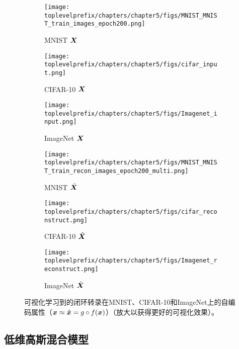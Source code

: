 \documentclass[../../book-main_zh.tex]{subfiles}
\begin{document}
\begin{figure}[t]
    \begin{subfigure}[t]{0.3\textwidth}
        \centering
        \texttt{[image: \\toplevelprefix/chapters/chapter5/figs/MNIST\_MNIST\_train\_images\_epoch200.png]}
        \caption{{\small MNIST $\bm{X}$}}
    \end{subfigure}
    \hfill
    \begin{subfigure}[t]{0.3\textwidth}
        \centering
        \texttt{[image: \\toplevelprefix/chapters/chapter5/figs/cifar\_input.png]}
        \caption{{\small CIFAR-10 $\bm{X}$}}
    \end{subfigure}
    \hfill
    \begin{subfigure}[t]{0.3\textwidth}
        \centering
        \texttt{[image: \\toplevelprefix/chapters/chapter5/figs/Imagenet\_input.png]}
        \caption{{\small ImageNet $\bm{X}$}}
    \end{subfigure}

    \begin{subfigure}[t]{0.3\textwidth}
        \centering
        \texttt{[image: \\toplevelprefix/chapters/chapter5/figs/MNIST\_MNIST\_train\_recon\_images\_epoch200\_multi.png]}
        \caption{{\small MNIST $\hat{\bm{X}}$}}
    \end{subfigure}
    \hfill
    \begin{subfigure}[t]{0.3\textwidth}
        \centering
        \texttt{[image: \\toplevelprefix/chapters/chapter5/figs/cifar\_reconstruct.png]}
        \caption{{\small CIFAR-10 $\hat{\bm{X}}$}}
    \end{subfigure}
    \hfill
    \begin{subfigure}[t]{0.3\textwidth}
        \centering
        \texttt{[image: \\toplevelprefix/chapters/chapter5/figs/Imagenet\_reconstruct.png]}
        \caption{{\small ImageNet $\hat{\bm{X}}$}}
    \end{subfigure}
    \caption{可视化学习到的闭环转录在MNIST、CIFAR-10和ImageNet上的自编码属性（$\bm{x} \approx \hat{\bm{x}} = g\circ f(\bm{x})$）（放大以获得更好的可视化效果）。}
    \label{fig:justify_xhat_equals_x}
\end{figure}

\subsection{低维高斯混合模型}
\end{document}
